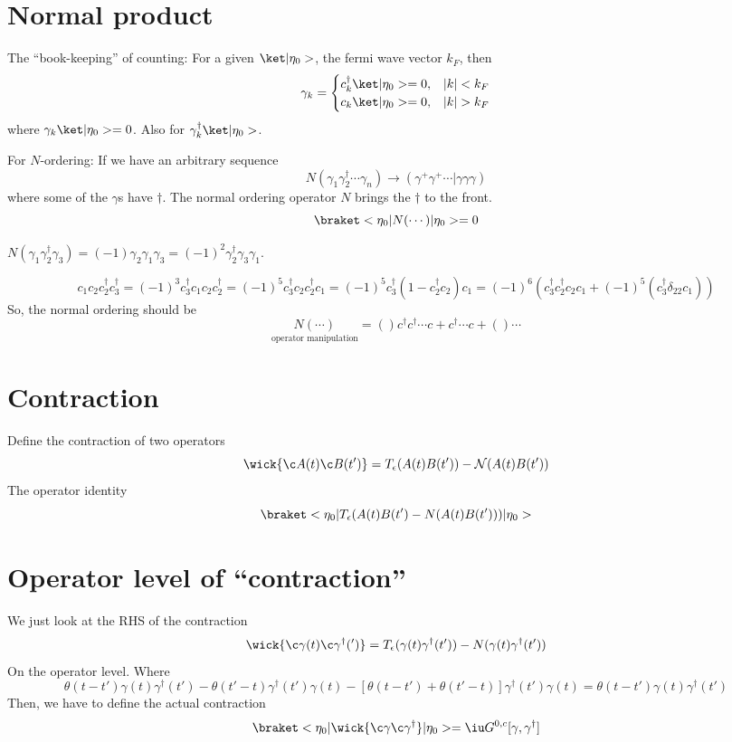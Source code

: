 \section{Normal product}

The ``book-keeping'' of counting:
For a given $\ket|\eta_0>$, the fermi wave vector $k_F$, then
\[
  \gamma_k = \begin{cases}
    c_k^\dagger \ket|\eta_0> = 0, & |k| < k_F\\
    c_k \ket|\eta_0> = 0, & |k| > k_F
  \end{cases}
\]
where $\gamma_k\ket|\eta_0> = 0$.
Also for $\gamma_k^\dagger\ket|\eta_0>$.

For $N$-ordering: If we have an arbitrary sequence
\[
  N(\gamma_1 \gamma_2^\dagger \cdots \gamma_n)
  \to (\gamma^+\gamma^+ \cdots | \gamma \gamma \gamma)
\]
where some of the $\gamma$s have $\dagger$.
The normal ordering operator $N$ brings the $\dagger$ to the front.
\[
  \braket<\eta_0|N(\cdots) |\eta_0> = 0
\]
\begin{example}
  $N(\gamma_1\gamma_2^\dagger \gamma_3) = (-1) \gamma_2\gamma_1\gamma_3
= (-1)^2 \gamma_2^\dagger \gamma_3 \gamma_1$.
\end{example}
\begin{example}
  \[c_1c_2c_2^\dagger c_3^\dagger
= (-1)^3c_3^\dagger c_1c_2c_2^\dagger
= (-1)^5c_3^\dagger c_2 c_2^\dagger c_1
= (-1)^5c_3^\dagger (1 - c_2^\dagger c_2)c_1
= (-1)^6 (c_3^\dagger c_2^\dagger c_2 c_1 + (-1)^5(c_3^\dagger\delta_{22}c_1))\]
So, the normal ordering should be
\[
  \underset{\text{operator manipulation}}{N(\cdots)}
= ()c^\dagger c^\dagger \cdots c + c^\dagger \cdots c + () \cdots
\]
\end{example}

\section{Contraction}

Define the contraction of two operators
\begin{equation}
  \wick{\c A(t) \c B(t')}
= T_\epsilon(A(t) B(t')) - \mathcal N(A(t)B(t'))
\end{equation}
The operator identity
\[
  \braket<\eta_0|T_\epsilon(A(t)B(t') - N(A(t)B(t')))|\eta_0>
\]
\section{Operator level of ``contraction''}

\begin{example}
  We just look at the RHS of the contraction
  \[
    \wick{\c \gamma(t) \c \gamma^\dagger(')}
  = T_\epsilon(\gamma(t) \gamma^\dagger(t')) - N(\gamma(t) \gamma^\dagger(t'))
  \]
  On the operator level. Where
  \[
    \theta(t - t') \gamma(t) \gamma^\dagger(t')
  - \theta(t' - t)\gamma^\dagger(t') \gamma(t)
  - [\theta(t - t') + \theta(t' - t)] \gamma^\dagger(t') \gamma(t)
  = \theta(t - t') \gamma(t) \gamma^\dagger(t')
  \]
  Then, we have to define the actual contraction
  \[
    \braket<\eta_0|\wick{\c \gamma \c \gamma^\dagger}|\eta_0>
  = \iu G^{0,c}[\gamma, \gamma^\dagger]
  \]
\end{example}

